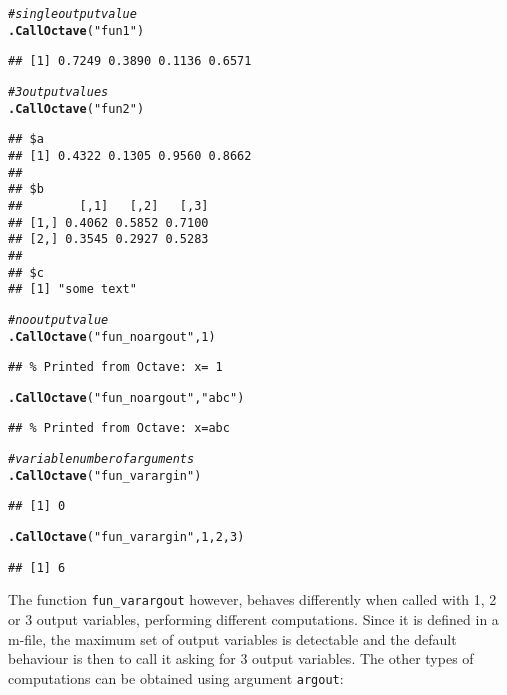 \documentclass[english,10pt,a4paper]{article}\usepackage[]{graphicx}\usepackage[]{color}
\makeatletter
\newcommand{\hlnum}[1]{\textcolor[rgb]{0.686,0.059,0.569}{#1}}%
\newcommand{\hlstr}[1]{\textcolor[rgb]{0.192,0.494,0.8}{#1}}%
\newcommand{\hlcom}[1]{\textcolor[rgb]{0.678,0.584,0.686}{\textit{#1}}}%
\newcommand{\hlstd}[1]{\textcolor[rgb]{0.345,0.345,0.345}{#1}}%
\newcommand{\hlkwd}[1]{\textcolor[rgb]{0.737,0.353,0.396}{\textbf{#1}}}%
\newenvironment{kframe}{%
 \def\at@end@of@kframe{}%
 \ifinner\ifhmode%
  \def\at@end@of@kframe{\end{minipage}}%
  \begin{minipage}{\columnwidth}%
 \fi\fi%
 \def\FrameCommand##1{\hskip\@totalleftmargin \hskip-\fboxsep
 \colorbox{shadecolor}{##1}\hskip-\fboxsep
     \hskip-\linewidth \hskip-\@totalleftmargin \hskip\columnwidth}%
 \MakeFramed {\advance\hsize-\width
   \@totalleftmargin\z@ \linewidth\hsize
   \@setminipage}}%
 {\par\unskip\endMakeFramed%
 \at@end@of@kframe}
\newenvironment{knitrout}{}{} %
\let\code=\texttt
\makeatother
\begin{document}
\begin{knitrout}
\color{fgcolor}\begin{kframe}
\begin{alltt}
\hlcom{# single output value}
\hlkwd{.CallOctave}\hlstd{(}\hlstr{"fun1"}\hlstd{)}
\end{alltt}
\begin{verbatim}
## [1] 0.7249 0.3890 0.1136 0.6571
\end{verbatim}
\begin{alltt}
\hlcom{# 3 output values}
\hlkwd{.CallOctave}\hlstd{(}\hlstr{"fun2"}\hlstd{)}
\end{alltt}
\begin{verbatim}
## $a
## [1] 0.4322 0.1305 0.9560 0.8662
## 
## $b
##        [,1]   [,2]   [,3]
## [1,] 0.4062 0.5852 0.7100
## [2,] 0.3545 0.2927 0.5283
## 
## $c
## [1] "some text"
\end{verbatim}
\begin{alltt}
\hlcom{# no output value}
\hlkwd{.CallOctave}\hlstd{(}\hlstr{"fun_noargout"}\hlstd{,} \hlnum{1}\hlstd{)}
\end{alltt}
\begin{verbatim}
## % Printed from Octave: x= 1
\end{verbatim}
\begin{alltt}
\hlkwd{.CallOctave}\hlstd{(}\hlstr{"fun_noargout"}\hlstd{,} \hlstr{"abc"}\hlstd{)}
\end{alltt}
\begin{verbatim}
## % Printed from Octave: x=abc
\end{verbatim}
\begin{alltt}
\hlcom{# variable number of arguments}
\hlkwd{.CallOctave}\hlstd{(}\hlstr{"fun_varargin"}\hlstd{)}
\end{alltt}
\begin{verbatim}
## [1] 0
\end{verbatim}
\begin{alltt}
\hlkwd{.CallOctave}\hlstd{(}\hlstr{"fun_varargin"}\hlstd{,} \hlnum{1}\hlstd{,} \hlnum{2}\hlstd{,} \hlnum{3}\hlstd{)}
\end{alltt}
\begin{verbatim}
## [1] 6
\end{verbatim}
\end{kframe}
\end{knitrout}


The function \code{fun\_varargout} however, behaves differently when called
with 1, 2 or 3 output variables, performing different computations.
Since it is defined in a m-file, the maximum set of output variables is
detectable and the default behaviour is then to call it asking for 3 output
variables.
The other types of computations can be obtained using argument \code{argout}:
\end{document}
